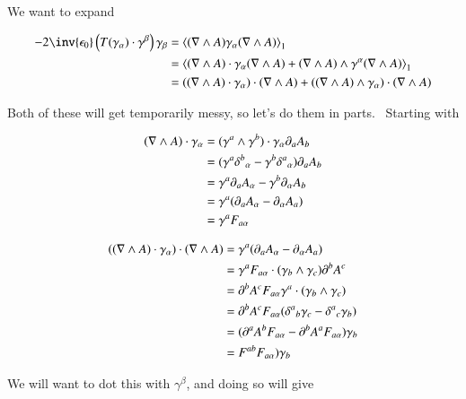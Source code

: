 \documentclass{article}
\begin{document}
We want to expand


\begin{align*}
-2 \inv{\epsilon_0} \left(T(\gamma_\alpha) \cdot \gamma^\beta \right) \gamma_\beta 
&= \gpgradeone{(\grad \wedge A) \gamma_\alpha (\grad \wedge A)} \\
&= \gpgradeone{
(\grad \wedge A) \cdot \gamma_\alpha (\grad \wedge A)
+ (\grad \wedge A) \wedge \gamma^\alpha (\grad \wedge A)
} \\
&=
((\grad \wedge A) \cdot \gamma_\alpha) \cdot (\grad \wedge A)
+ ((\grad \wedge A) \wedge \gamma_\alpha) \cdot (\grad \wedge A)
\\
\end{align*}

Both of these will get temporarily messy, so let's do them in parts.  Starting
with

\begin{align*}
(\nabla \wedge A) \cdot \gamma_\alpha
&= (\gamma^{a} \wedge \gamma^{b}) \cdot \gamma_{\alpha} \partial_{a} A_{b} \\
&= (\gamma^{a} {\delta^{b}}_{\alpha} -\gamma^{b} {\delta^{a}}_{\alpha} ) \partial_{a} A_{b} \\
&=
\gamma^{a} \partial_{a} A_{\alpha} 
-\gamma^{b} \partial_{\alpha} A_{b} \\
&= \gamma^{a} (\partial_{a} A_{\alpha} -\partial_{\alpha} A_{a} ) \\
&= \gamma^{a} F_{a \alpha} \\
\end{align*}


\begin{align*}
((\nabla \wedge A) \cdot \gamma_\alpha) \cdot (\nabla \wedge A) 
&= \gamma^{a} (\partial_{a} A_{\alpha} -\partial_{\alpha} A_{a} ) \\
&= \gamma^{a} F_{a \alpha} \cdot (\gamma_{b} \wedge \gamma_{c}) \partial^{b} A^{c} \\
&= 
\partial^{b} A^{c} F_{a \alpha} 
\gamma^{a} \cdot (\gamma_{b} \wedge \gamma_{c}) 
\\
&= 
\partial^{b} A^{c} F_{a \alpha} 
(
{\delta^{a}}_{b} \gamma_{c}
-{\delta^{a}}_{c} \gamma_{b}
)
\\
&= 
(\partial^{a} A^{b} F_{a \alpha} -\partial^{b} A^{a} F_{a \alpha} )\gamma_{b}
\\
&= F^{a b} F_{a \alpha} ) \gamma_{b} \\
\end{align*}

We will want to dot this with $\gamma^\beta$, and doing so will give
\end{document}
